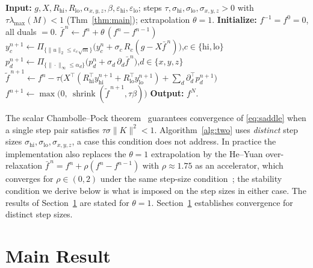 \documentclass{article}
\begin{document}
\begin{algorithm}[t]
\caption{Preconditioned PDHG with split low/high fidelity channels}
\label{alg:two}
\begin{algorithmic}[1]
\State \textbf{Input:} $g,X,R_{\mathrm{hi}},R_{\mathrm{lo}},\alpha_{x,y,z},\beta,\varepsilon_{\mathrm{hi}},\varepsilon_{\mathrm{lo}}$; steps $\tau,\sigma_{\mathrm{hi}},\sigma_{\mathrm{lo}},\sigma_{x,y,z}>0$ with $\tau\lambda_{\max}(M)<1$ (Thm~\ref{thm:main}); extrapolation $\theta=1$.
\State \textbf{Initialize:} $f^{-1}=f^{0}=0$, all duals $=0$.
  \State $\bar f^{\,n}\gets f^{n}+\theta\,(f^{n}-f^{n-1})$ 
  \State $y_{c}^{n+1}\gets \Pi_{\{\|u\|_2\le\varepsilon_c\sqrt m\}}\!\big(y_{c}^{n}+\sigma_{c}\,R_{c}(g-X\bar f^{\,n})\big)$,\quad $c\in\{\mathrm{hi},\mathrm{lo}\}$
  \State $p_{d}^{n+1}\gets \Pi_{\{\|\cdot\|_\infty\le\alpha_d\}}\!\big(p_{d}^{n}+\sigma_{d}\,\partial_d\bar f^{\,n}\big)$,\quad $d\in\{x,y,z\}$
  \State $\tilde f^{\,n+1}\gets f^{n}-\tau\big(X^\top(R_{\mathrm{hi}}^\top y_{\mathrm{hi}}^{n+1}+R_{\mathrm{lo}}^\top y_{\mathrm{lo}}^{n+1})+\sum_d\partial_d^\top p_d^{n+1}\big)$
  \State $f^{n+1}\gets \max\!\big(0,\ \operatorname{shrink}(\tilde f^{\,n+1},\tau\beta)\big)$
\EndFor
\State \textbf{Output:} $f^{N}$.
\end{algorithmic}
\end{algorithm}

The scalar Chambolle--Pock theorem~\citep{chambolle2011first} guarantees convergence of \eqref{eq:saddle} when a single step pair satisfies $\tau\sigma\|K\|^2<1$. Algorithm~\ref{alg:two} uses \emph{distinct} step sizes $\sigma_{\mathrm{hi}},\sigma_{\mathrm{lo}},\sigma_{x,y,z}$, a case this condition does not address. In practice the implementation also replaces the $\theta=1$ extrapolation by the He--Yuan over-relaxation $\bar f^{\,n}=f^n+\rho(f^n-f^{n-1})$ with $\rho\approx1.75$ as an accelerator, which converges for $\rho\in(0,2)$ under the same step-size condition~\citep{he2012convergence}; the stability condition we derive below is what is imposed on the step sizes in either case. The results of Section~\ref{sec:main} are stated for $\theta=1$. Section~\ref{sec:main} establishes convergence for distinct step sizes.

\section{Main Result}
\label{sec:main}
\end{document}
